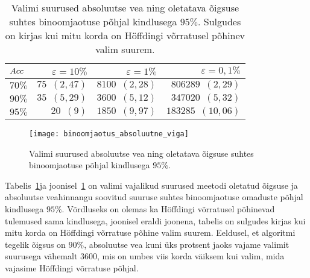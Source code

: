 \begin{table}[H]
    \centering
    \caption{Valimi suurused absoluutse vea ning oletatava õigsuse suhtes binoomjaotuse põhjal kindlusega $95\%$. Sulgudes on kirjas kui mitu korda on Höffdingi võrratusel põhinev valim suurem.}
    \begin{tabular}{l | r r r}
        $Acc$ & $\varepsilon = 10\%$ & $\varepsilon = 1\%$ & $\varepsilon = 0,1\%$ \\
    	\hline
    	$70\%$ & $75\enspace(2{,}47)$ & $8100\enspace(2{,}28)$ & $806289\enspace(2{,}29)$ \\
    	$90\%$ & $35\enspace(5{,}29)$ & $3600\enspace(5{,}12)$ & $347020\enspace(5{,}32)$ \\
    	$95\%$ & $20\enspace(9)$      & $1850\enspace(9{,}97)$ & $183285\enspace(10{,}06)$ \\
    \end{tabular}
    \label{tab:binoomjaotus absoluutne viga}
\end{table}

\begin{figure}[H]
    \begin{center}
        \texttt{[image: binoomjaotus\_absoluutne\_viga]}
    \end{center}
    \caption{Valimi suurused absoluutse vea ning oletatava õigsuse suhtes binoomjaotuse põhjal kindlusega $95\%$.}
    \label{fig:binoomjaotus absoluutne viga}
\end{figure}

Tabelis~\ref{tab:binoomjaotus absoluutne viga}ja joonisel~\ref{fig:binoomjaotus absoluutne viga} on valimi vajalikud suurused meetodi oletatud õigsuse ja absoluutse veahinnangu soovitud suuruse suhtes binoomjaotuse omaduste põhjal kindlusega $95\%$. Võrdluseks on olemas ka Höffdingi võrratusel põhinevad tulemused sama kindlusega, joonisel eraldi joonena, tabelis on sulgudes kirjas kui mitu korda on Höffdingi võrratuse põhine valim suurem. Eeldusel, et algoritmi tegelik õigsus on $90\%$, absoluutse vea kuni üks protsent jaoks vajame valimit suurusega vähemalt $3600$, mis on umbes viis korda väiksem kui valim, mida vajasime Höffdingi võrratuse põhjal.


